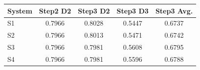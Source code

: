 \begin{tabular}{lcccc}
\toprule
System & Step2 D2 & Step3 D2 & Step3 D3 & Step3 Avg. \\
\midrule
S1 & 0.7966 & 0.8028 & 0.5447 & 0.6737 \\
S2 & 0.7966 & 0.8013 & 0.5471 & 0.6742 \\
S3 & 0.7966 & 0.7981 & 0.5608 & 0.6795 \\
S4 & 0.7966 & 0.7981 & 0.5596 & 0.6788 \\
\bottomrule
\end{tabular}
